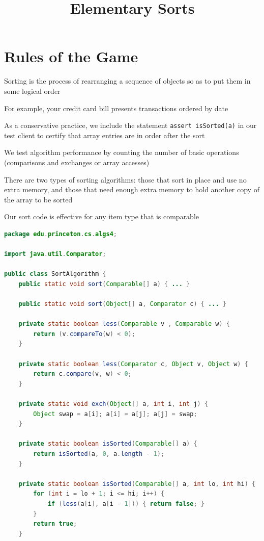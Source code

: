 \documentclass[8pt,a4paper,compress]{beamer}
\title{Elementary Sorts}
\date{}
\begin{document}
\begin{frame}
\vfill
\titlepage
\end{frame}

\section{Rules of the Game}
\begin{frame}[fragile]
\pause

Sorting is the process of rearranging a sequence of objects so as to put them in some logical order

\pause
\bigskip

For example, your credit card bill presents transactions ordered by date

\pause
\bigskip

As a conservative practice, we include the statement \lstinline{assert isSorted(a)} in our test client to certify that array entries are in order after the sort

\pause
\bigskip

We test algorithm performance by counting the number of basic
operations (comparisons and exchanges or array accesses)

\pause
\bigskip

There are two types of sorting algorithms: those that sort in place and use no extra memory, and those that need enough extra memory to hold another copy of the array to be sorted

\pause
\bigskip

Our sort code is effective for any item type that is comparable
\end{frame}

\begin{frame}[fragile]
\pause

\begin{lstlisting}[language=Java,style=focusin]
package edu.princeton.cs.algs4;

import java.util.Comparator;

public class SortAlgorithm {
    public static void sort(Comparable[] a) { ... }
    
    public static void sort(Object[] a, Comparator c) { ... }

    private static boolean less(Comparable v , Comparable w) {
        return (v.compareTo(w) < 0);
    }

    private static boolean less(Comparator c, Object v, Object w) {
        return c.compare(v, w) < 0;
    }
        
    private static void exch(Object[] a, int i, int j) {
        Object swap = a[i]; a[i] = a[j]; a[j] = swap;
    }
    
    private static boolean isSorted(Comparable[] a) {
        return isSorted(a, 0, a.length - 1);
    }

    private static boolean isSorted(Comparable[] a, int lo, int hi) {
        for (int i = lo + 1; i <= hi; i++) {
            if (less(a[i], a[i - 1])) { return false; }
        }
        return true;
    }
\end{lstlisting}
\end{frame}
\end{document}
